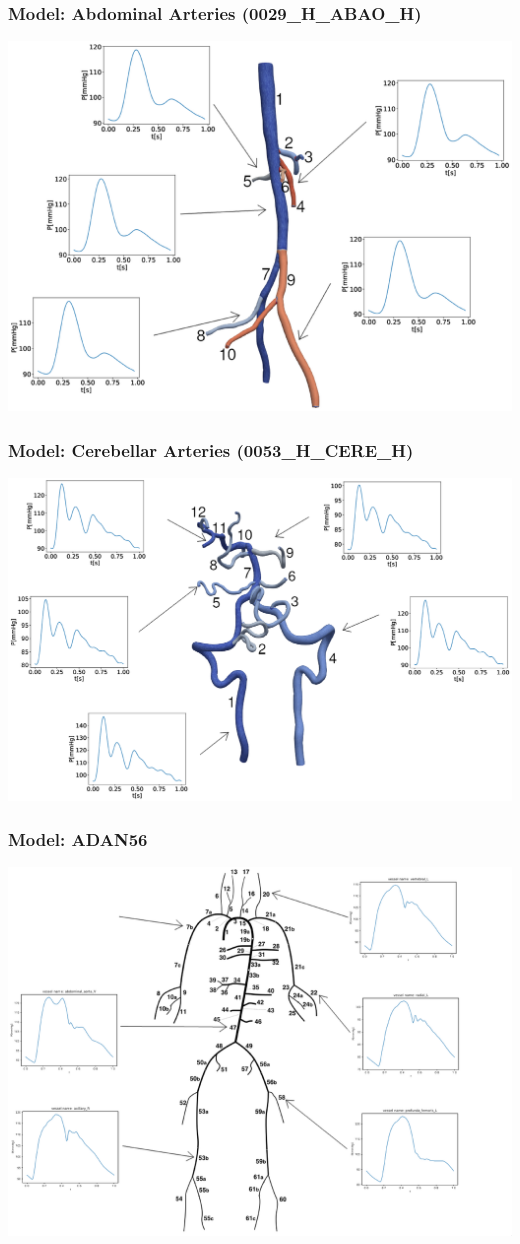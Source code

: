\documentclass{beamer}
\begin{document}
	\begin{frame}
		\frametitle{Model: Abdominal Arteries (0029\_H\_ABAO\_H)}
		\includegraphics[width=\columnwidth]{images/0029.eps}
	\end{frame}
	\begin{frame}
		\frametitle{Model: Cerebellar Arteries (0053\_H\_CERE\_H)}
		\includegraphics[width=\columnwidth]{images/0053.eps}
	\end{frame}
	\begin{frame}
		\frametitle{Model: ADAN56}
		\includegraphics[width=\textwidth]{images/adan56.eps}
	\end{frame}
\end{document}
